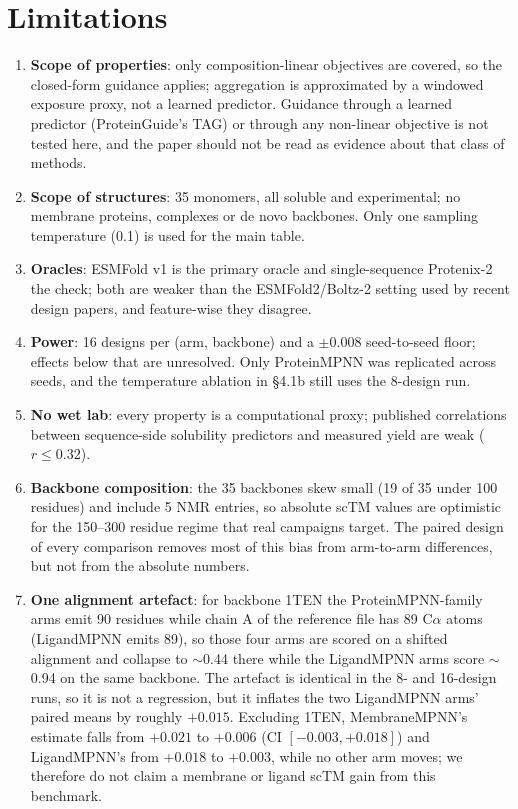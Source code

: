 \section{Limitations}
\label{sec:limitations}

\begin{enumerate}
\item \textbf{Scope of properties}: only composition-linear objectives are
  covered, so the closed-form guidance applies; aggregation is approximated by a
  windowed exposure proxy, not a learned predictor. Guidance through a learned
  predictor (ProteinGuide's TAG) or through any non-linear objective is not
  tested here, and the paper should not be read as evidence about that class of
  methods.
\item \textbf{Scope of structures}: 35 monomers, all soluble and experimental;
  no membrane proteins, complexes or de novo backbones.
  Only one sampling temperature (0.1) is used for the main table.
\item \textbf{Oracles}: ESMFold v1 is the primary oracle and single-sequence
  Protenix-2 the check; both are weaker than the ESMFold2/Boltz-2 setting used
  by recent design papers, and feature-wise they disagree.
\item \textbf{Power}: 16 designs per (arm, backbone) and a $\pm 0.008$
  seed-to-seed floor; effects below that are unresolved. Only ProteinMPNN was
  replicated across seeds, and the temperature ablation in \S4.1b still uses the
  8-design run.
\item \textbf{No wet lab}: every property is a computational proxy; published
  correlations between sequence-side solubility predictors and measured yield
  are weak ($r \leq 0.32$).
\item \textbf{Backbone composition}: the 35 backbones skew small (19 of 35 under
  100 residues) and include 5 NMR entries, so absolute scTM values are
  optimistic for the 150--300 residue regime that real campaigns target. The
  paired design of every comparison removes most of this bias from arm-to-arm
  differences, but not from the absolute numbers.
\item \textbf{One alignment artefact}: for backbone 1TEN the ProteinMPNN-family
  arms emit 90 residues while chain A of the reference file has 89 C$\alpha$
  atoms (LigandMPNN emits 89), so those four arms are scored on a shifted
  alignment and collapse to $\sim$0.44 there while the LigandMPNN arms score
  $\sim$0.94 on the same backbone. The artefact is identical in the 8- and
  16-design runs, so it is not a regression, but it inflates the two LigandMPNN
  arms' paired means by roughly $+0.015$. Excluding 1TEN, MembraneMPNN's estimate
  falls from $+0.021$ to $+0.006$ (CI $[-0.003, +0.018]$) and LigandMPNN's from
  $+0.018$ to $+0.003$, while no other arm moves; we therefore do not claim a
  membrane or ligand scTM gain from this benchmark.
\end{enumerate}
